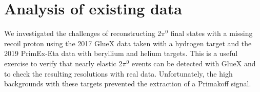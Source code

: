 
\section{Analysis of existing data}
We investigated the challenges of reconstructing 2$\pi^0$ final states
with a missing recoil proton using the 2017 GlueX data taken with a
hydrogen target and the 2019 PrimEx-Eta data with beryllium and helium targets.
This is a useful exercise to verify that nearly elastic 2$\pi^0$
events can be detected with GlueX and to check the resulting
resolutions with real data. Unfortunately, the high backgrounds with these targets prevented the extraction of a Primakoff signal.

